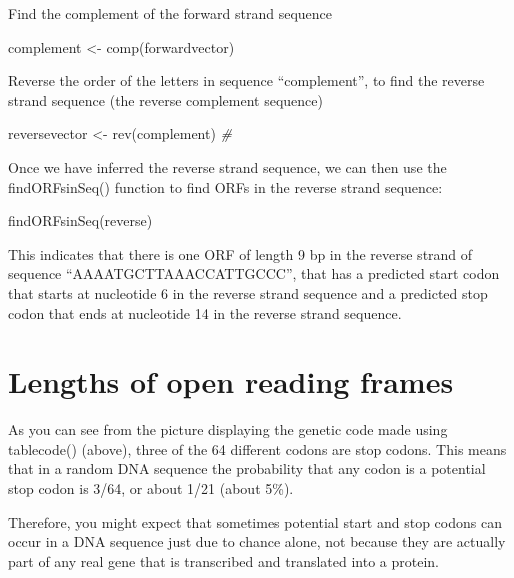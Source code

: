 \documentclass[
]{book}
\newenvironment{Shaded}{\begin{snugshade}}{\end{snugshade}}
\newcommand{\CommentTok}[1]{\textcolor[rgb]{0.56,0.35,0.01}{\textit{#1}}}
\newcommand{\FunctionTok}[1]{\textcolor[rgb]{0.00,0.00,0.00}{#1}}
\newcommand{\NormalTok}[1]{#1}
\newcommand{\OtherTok}[1]{\textcolor[rgb]{0.56,0.35,0.01}{#1}}
\begin{document}
Find the complement of the forward strand sequence

\begin{Shaded}
\begin{Highlighting}[]
\NormalTok{complement }\OtherTok{\textless{}{-}} \FunctionTok{comp}\NormalTok{(forwardvector)            }
\end{Highlighting}
\end{Shaded}

Reverse the order of the letters in sequence ``complement'', to
find the reverse strand sequence (the reverse complement sequence)

\begin{Shaded}
\begin{Highlighting}[]
\NormalTok{reversevector }\OtherTok{\textless{}{-}} \FunctionTok{rev}\NormalTok{(complement)             }\CommentTok{\# }
\end{Highlighting}
\end{Shaded}

Once we have inferred the reverse strand sequence, we can then use the findORFsinSeq() function to find ORFs in the reverse strand sequence:

\begin{Shaded}
\begin{Highlighting}[]
\FunctionTok{findORFsinSeq}\NormalTok{(reverse)}
\end{Highlighting}
\end{Shaded}

This indicates that there is one ORF of length 9 bp in the reverse strand of sequence ``AAAATGCTTAAACCATTGCCC'', that has a predicted start codon that starts at nucleotide 6 in the reverse strand sequence and a predicted stop codon that ends at nucleotide 14 in the reverse strand sequence.

\hypertarget{lengths-of-open-reading-frames}{%
\section{Lengths of open reading frames}\label{lengths-of-open-reading-frames}}

As you can see from the picture displaying the genetic code made using tablecode() (above), three of the 64 different codons are stop codons. This means that in a random DNA sequence the probability that any codon is a potential stop codon is 3/64, or about 1/21 (about 5\%).

Therefore, you might expect that sometimes potential start and stop codons can occur in a DNA sequence just due to chance alone, not because they are actually part of any real gene that is transcribed and translated into a protein.
\end{document}
